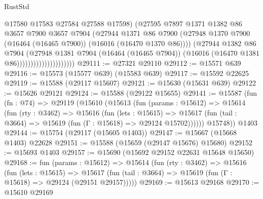 \begin{lexlean}{RustStd}
\begin{coremodule}
                                      @17580
                                      @17583
                                      @27584
                                      @27588
                                      @17598)
                                    (@27595
                                      @7897
                                      @1371
                                      @1382
                                      @86
                                      @3657
                                      @7900
                                      @3657
                                      @7904
                                      (@27944
                                        @1371
                                        @86
                                        @7900
                                        (@27948
                                          @1370
                                          @7900
                                          (@16464 (@16465 @7900))
                                          (@16016 (@16470 @1370 @86))))
                                      (@27944
                                        @1382
                                        @86
                                        @7904
                                        (@27948
                                          @1381
                                          @7904
                                          (@16464 (@16465 @7904))
                                          (@16016 (@16470 @1381 @86)))))))))))))))))))))
@29111 := @27321 @29110
@29112 := @15571 @639
@29116 := @15573 (@15577 @639) (@15583 @639)
@29117 := @15592 @22625
@29119 := @15588 (@29117 @15607)
@29121 := @15630 (@15631 @639)
@29122 := @15626 @29121
@29124 := @15588 (@29122 @15655)
@29141 := @15587
    (fun (fn : @74) =>
    @29119
      (@15610
        (@15613
          (fun (params : @15612) =>
          @15614
            (fun (rty : @3462) =>
            @15616
              (fun (lets : @15615) =>
              @15617 (fun (tail : @3664) => @15619 (fun (Γ : @15618) => @29124 @15702))))))
        @15748))
    @1403
@29144 := @15754 (@29117 (@15605 @1403))
@29147 := @15667 (@15668 @1403) @22628
@29151 := @15588 (@15659 (@29147 @15676) @15680)
@29152 := @15693 @1403
@29157 := @15690 (@15692 @29152 @22631 @15648 @15650)
@29168 := fun (params : @15612) =>
  @15614
    (fun (rty : @3462) =>
    @15616
      (fun (lets : @15615) =>
      @15617 (fun (tail : @3664) => @15619 (fun (Γ : @15618) => @29124 (@29151 @29157)))))
@29169 := @15613 @29168
@29170 := @15610 @29169

\end{coremodule}
\end{lexlean}
